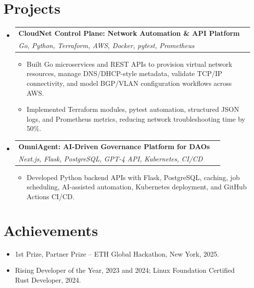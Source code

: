 \documentclass[letterpaper,10pt]{article}
\makeatletter
\newcommand{\resumeItem}[1]{\item\small{#1\vspace{-2pt}}}
\newcommand{\resumeSubheading}[4]{\vspace{-2pt}\item
  \begin{tabular*}{1.0\textwidth}[t]{l@{\extracolsep{\fill}}r}
    \textbf{#1} & \textbf{\small #2} \\
    \textit{\small#3} & \textit{\small #4} \\
  \end{tabular*}\vspace{-7pt}}
\newcommand{\resumeItemListStart}{\begin{itemize}[leftmargin=*]}
\newcommand{\resumeItemListEnd}{\end{itemize}\vspace{-5pt}}
\newcommand{\resumeSubHeadingListStart}{\begin{itemize}[leftmargin=0in, label={}]}
\newcommand{\resumeSubHeadingListEnd}{\end{itemize}}
\makeatother
\begin{document}
\section{Projects}
\resumeSubHeadingListStart

  \resumeSubheading
    {CloudNet Control Plane: Network Automation \& API Platform}{}
    {Go, Python, Terraform, AWS, Docker, pytest, Prometheus}{ }
    \resumeItemListStart
      \resumeItem{Built Go microservices and REST APIs to provision virtual network resources, manage DNS/DHCP-style metadata, validate TCP/IP connectivity, and model BGP/VLAN configuration workflows across AWS.}
      \resumeItem{Implemented Terraform modules, pytest automation, structured JSON logs, and Prometheus metrics, reducing network troubleshooting time by 50\%.}
    \resumeItemListEnd

  \resumeSubheading
    {OmniAgent: AI-Driven Governance Platform for DAOs}{}
    {Next.js, Flask, PostgreSQL, GPT-4 API, Kubernetes, CI/CD}{ }
    \resumeItemListStart
      \resumeItem{Developed Python backend APIs with Flask, PostgreSQL, caching, job scheduling, AI-assisted automation, Kubernetes deployment, and GitHub Actions CI/CD.}
    \resumeItemListEnd

\resumeSubHeadingListEnd

\section{Achievements}
\resumeSubHeadingListStart
  \resumeItem{1st Prize, Partner Prize -- ETH Global Hackathon, New York, 2025.}
  \resumeItem{Rising Developer of the Year, 2023 and 2024; Linux Foundation Certified Rust Developer, 2024.}
\resumeSubHeadingListEnd
\end{document}
